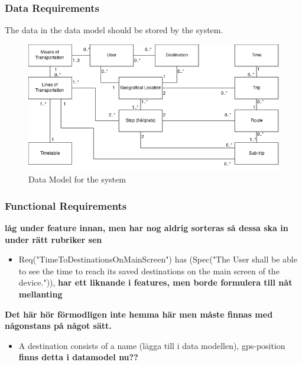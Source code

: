 \documentclass[a4paper]{article}
\begin{document}
			\subsubsection{Data Requirements}
				The data in the data model should be stored by the system.	
				\begin{figure}[h]
					\includegraphics[scale=0.50]{datamodel-v2.png}
					\caption{Data Model for the system}
				\end{figure}
				
				

			\subsubsection{Functional Requirements}
				
		
				\textbf{låg under feature innan, men har nog aldrig sorteras så dessa ska in under rätt rubriker sen}
			
				\begin{itemize}
					


					\item Req("TimeToDestinationsOnMainScreen") has (Spec("The User shall be able to see the time to reach its saved destinations on the main screen of the device.")), \textbf{har ett liknande i features, men borde formulera till nåt mellanting}
				\end{itemize}	
					
					
				\textbf{Det här hör förmodligen inte hemma här men måste finnas med någonstans på något sätt.}
				\begin{itemize}
					
					\item A destination consists of a name (lägga till i data modellen), gps-position \textbf{finns detta i datamodel nu??}
				\end{itemize}
\end{document}
